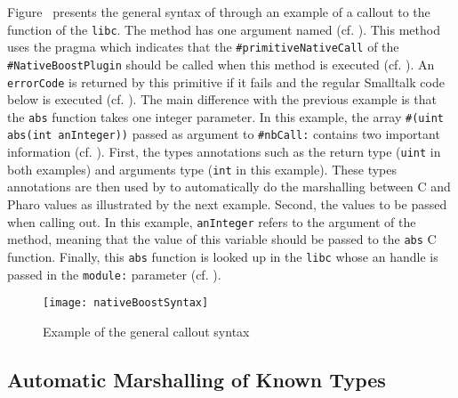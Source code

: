 Figure~ presents the general syntax of \NBFFI through an example of a callout to the  function of the \texttt{libc}.
The  method has one argument named  (cf. ).
This method uses the pragma  which indicates that the \texttt{\#primitiveNativeCall} of the \texttt{\#NativeBoostPlugin} should be called when this method is executed (cf. ).
An \texttt{errorCode} is returned by this primitive if it fails and the regular Smalltalk code below is executed (cf. ).
The main difference with the previous example is that the \texttt{abs} function takes one integer parameter.
In this example, the array \texttt{\#(uint abs(int anInteger))} passed as argument to \texttt{\#nbCall:} contains two important information (cf. ).
First, the types annotations such as the return type (\texttt{uint} in both examples) and arguments type (\texttt{int} in this example).
These types annotations are then used by \NBFFI to automatically do the marshalling between C and Pharo values as illustrated by the next example.
Second, the values to be passed when calling out.
In this example, \texttt{anInteger} refers to the argument of the  method, meaning that the value of this variable should be passed to the \texttt{abs} C function.
Finally, this \texttt{abs} function is looked up in the \texttt{libc} whose an handle is passed in the \texttt{module:} parameter (cf. ).
%
%
\begin{figure}[H]
	\centering
	\texttt{[image: nativeBoostSyntax]}
	\caption[\NB basic method]{Example of the general \NBFFI callout syntax}
\end{figure}

\subsection{Automatic Marshalling of Known Types}

